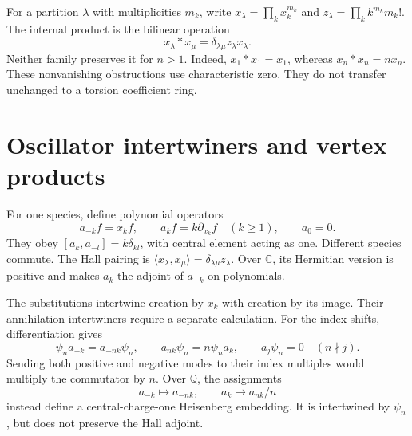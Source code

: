 For a partition $\lambda$ with multiplicities $m_k$, write
$x_\lambda=\prod_kx_k^{m_k}$ and $z_\lambda=\prod_kk^{m_k}m_k!$.
The internal product is the bilinear operation
\[
 x_\lambda*x_\mu=\delta_{\lambda\mu}z_\lambda x_\lambda.
\]
Neither family preserves it for $n>1$.
Indeed, $x_1*x_1=x_1$, whereas $x_n*x_n=nx_n$.
These nonvanishing obstructions use characteristic zero.
They do not transfer unchanged to a torsion coefficient ring.

\section{Oscillator intertwiners and vertex products}
\label{v4-arith:hecke:sec:oscillators}

For one species, define polynomial operators
\[
 a_{-k}f=x_kf,\qquad a_kf=k\partial_{x_k}f\quad(k\geq1),
 \qquad a_0=0.
\]
They obey $[a_k,a_{-l}]=k\delta_{kl}$, with central element acting as one.
Different species commute.
The Hall pairing is
$\langle x_\lambda,x_\mu\rangle=\delta_{\lambda\mu}z_\lambda$.
Over $\mathbb C$, its Hermitian version is positive and makes
$a_k$ the adjoint of $a_{-k}$ on polynomials.

The substitutions intertwine creation by $x_k$ with creation
by its image. Their annihilation intertwiners require a separate calculation.
For the index shifts, differentiation gives
\begin{equation}
 \label{v4-arith:hecke:eq:adams-oscillators}
 \psi_na_{-k}=a_{-nk}\psi_n,\qquad
 a_{nk}\psi_n=n\psi_na_k,\qquad
 a_j\psi_n=0\quad(n\nmid j).
\end{equation}
Sending both positive and negative modes to their index multiples
would multiply the commutator by $n$.
Over $\mathbb Q$, the assignments
\[
 a_{-k}\longmapsto a_{-nk},\qquad
 a_k\longmapsto a_{nk}/n
\]
instead define a central-charge-one Heisenberg embedding.
It is intertwined by $\psi_n$, but does not preserve the Hall adjoint.

